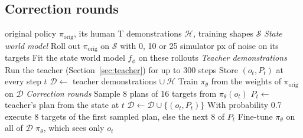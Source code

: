 \documentclass[10pt,twocolumn,letterpaper]{article}
\begin{document}
\subsection{Correction rounds}
\label{sec:dagger}

\begin{algorithm}[tb]
  \caption{Training the camera policy. $o_t$ is the policy's input (two camera frames and the pusher position) and
  $P_t$ the teacher's intended plan (the first 16 targets of its best plan at step $t$).}
  \label{alg:train}
  \small
  \begin{algorithmic}[1]
    \Require original policy $\pi_{\mathrm{orig}}$, its human T demonstrations $\mathcal{H}$, training shapes
      $\mathcal{S}$
    \Statex \textit{State world model}
    \State Roll out $\pi_{\mathrm{orig}}$ on $\mathcal{S}$ with 0, 10 or 25 simulator px of noise on its targets
    \State Fit the state world model $f_\phi$ on these rollouts
    \Statex \textit{Teacher demonstrations}
      \State Run the teacher (Section~\ref{sec:teacher}) for up to 300 steps
      \State Store $(o_t, P_t)$ at every step $t$
    \EndFor
    \State $\mathcal{D} \gets$ teacher demonstrations $\cup\ \mathcal{H}$
    \State Train $\pi_\theta$ from the weights of $\pi_{\mathrm{orig}}$ on $\mathcal{D}$
    \Statex \textit{Correction rounds}
     
          \State Sample 8 plans of 16 targets from $\pi_\theta(o_t)$
          \State $P_t \gets$ teacher's plan from the state at $t$
          \State $\mathcal{D} \gets \mathcal{D} \cup \{(o_t, P_t)\}$
          \State With probability 0.7 execute 8 targets of the first sampled plan, else the next 8 of $P_t$
        \EndFor
      \EndFor
      \State Fine-tune $\pi_\theta$ on all of $\mathcal{D}$
    \EndFor
    \Ensure $\pi_\theta$, which sees only $o_t$
  \end{algorithmic}
\end{algorithm}
\end{document}
